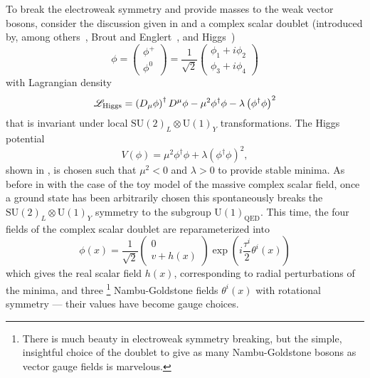To break the electroweak symmetry and provide masses to the weak vector bosons, consider the discussion given in  and a complex scalar doublet (introduced by, among others~\cite{Guralnik:1964eu,Kibble:2015mwa}, Brout and Englert~\cite{Englert:1964et}, and Higgs~\cite{Higgs:1964ia,Higgs:1964pj})
\begin{equation}
 \phi = \begin{pmatrix}%
  \phi^{+} \\%
  \phi^{0}
 \end{pmatrix} = \frac{1}{\sqrt{2}} \begin{pmatrix}%
  \phi_{1} + i \phi_{2} \\%
  \phi_{3} + i \phi_{4}%
 \end{pmatrix}%
 \label{eq:Higgs_doublet}
\end{equation}
with Lagrangian density
\begin{equation}
 \mathscr{L}_{\textrm{Higgs}} = \left(D_{\mu}\phi\right)^{\dagger}D^{\mu}\phi - \mu^{2}\phi^{\dagger}\phi - \lambda \left(\phi^{\dagger}\phi\right)^{2}
 \label{eq:Higgs_Lagrangian}
\end{equation}
that is invariant under local $\mathrm{SU}(2)_{L} \otimes \mathrm{U}(1)_{Y}$ transformations.
The Higgs potential
\begin{equation}
 V\left(\phi\right) = \mu^{2}\phi^{\dagger}\phi + \lambda \left(\phi^{\dagger}\phi\right)^{2},
 \label{eq:Higgs_potential}
\end{equation}
shown in , is chosen such that $\mu^{2} < 0$ and $\lambda > 0$ to provide stable minima.
As before in  with the case of the toy model of the massive complex scalar field, once a ground state has been arbitrarily chosen this spontaneously breaks the $\mathrm{SU}(2)_{L} \otimes \mathrm{U}(1)_{Y}$ symmetry to the subgroup $\mathrm{U}(1)_{\textrm{QED}}$.
This time, the four fields of the complex scalar doublet are reparameterized into
\[
 \phi(x) = \frac{1}{\sqrt{2}} \begin{pmatrix}
  0 \\
  v + h(x)
 \end{pmatrix}
 \exp\left(i \frac{\tau^{i}}{2} \theta^{i}(x)\right)
\]
which gives the real scalar field $h(x)$, corresponding to radial perturbations of the minima, and three%
\footnote{There is much beauty in electroweak symmetry breaking, but the simple, insightful choice of the doublet to give as many Nambu-Goldstone bosons as vector gauge fields is marvelous.}
Nambu-Goldstone fields $\theta^{i}(x)$ with rotational symmetry --- their values have become gauge choices.
